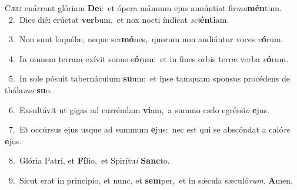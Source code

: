\lettrine{\initial\textcolor{\initialcolor}{C}}{æli} enárrant glóriam \textbf{De}\-i:~\star et ópera mánuum ejus annúntiat fir\-\textit{ma}\-\textbf{mén}tum.\\
{\numbfont\textcolor{\numbcolor}{~2.}}~Dies diéi erúctat \textbf{ver}\-bum,~\star et nox nocti índicat \textit{sci}\-\textbf{én}\textbf{ti}am.\par
{\numbfont\textcolor{\numbcolor}{~3.}}~Non sunt loquélæ, neque ser\-\textbf{mó}\-nes,~\star quorum non audiántur voces \textit{e}\-\textbf{ó}rum.\par
{\numbfont\textcolor{\numbcolor}{~4.}}~In omnem terram exívit sonus e\-\textbf{ó}\-rum:~\star et in fines orbis terræ verba \textit{e}\-\textbf{ó}rum.\par
{\numbfont\textcolor{\numbcolor}{~5.}}~In sole pósuit tabernáculum \textbf{su}\-um:~\star et ipse tamquam sponsus procédens de thála\textit{mo} \textbf{su}\-o.\par
{\numbfont\textcolor{\numbcolor}{~6.}}~Exsultávit ut gigas ad curréndam \textbf{vi}\-am,~\star a summo cælo egréssi\textit{o} \textbf{e}\-jus.\par
{\numbfont\textcolor{\numbcolor}{~7.}}~Et occúrsus ejus usque ad summum \textbf{e}\-jus:~\star nec est qui se abscóndat a caló\textit{re} \textbf{e}\-jus.\par
{\numbfont\textcolor{\numbcolor}{~8.}}~Glória Patri, et \textbf{Fí}\-lio,~\star et Spirítu\textit{i} \textbf{Sanc}\-to.\par
{\numbfont\textcolor{\numbcolor}{~9.}}~Sicut erat in princípio, et nunc, et \textbf{sem}\-per,~\star et in sǽcula sæculó\-\textit{rum}\-. \textbf{A}\-men.\par
